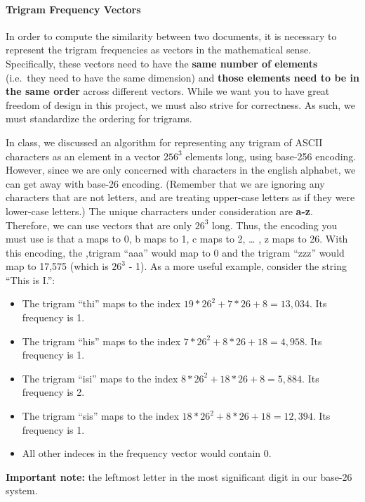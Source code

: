 \documentclass[]{article}
\providecommand{\tightlist}{%
  \setlength{\itemsep}{0pt}\setlength{\parskip}{0pt}}
\let\oldparagraph\paragraph
\renewcommand{\paragraph}[1]{\oldparagraph{#1}\mbox{}}
\begin{document}
\paragraph{Trigram Frequency Vectors}\label{trigram-frequency-vectors}

In order to compute the similarity between two documents, it is
necessary to represent the trigram frequencies as vectors in the
mathematical sense. Specifically, these vectors need to have the
\textbf{same number of elements} (i.e.~they need to have the same
dimension) and \textbf{those elements need to be in the same order}
across different vectors. While we want you to have great freedom of
design in this project, we must also strive for correctness. As such, we
must standardize the ordering for trigrams.

In class, we discussed an algorithm for representing any trigram of
ASCII characters as an element in a vector \(256^3\) elements long,
using base-256 encoding. However, since we are only concerned with
characters in the english alphabet, we can get away with base-26
encoding. (Remember that we are ignoring any characters that are not
letters, and are treating upper-case letters as if they were lower-case
letters.) The unique charracters under consideration are \textbf{a-z}.
Therefore, we can use vectors that are only \(26^3\) long. Thus, the
encoding you must use is that a maps to 0, b maps to 1, c maps to 2,
\ldots{} , z maps to 26. With this encoding, the ,trigram ``aaa'' would
map to 0 and the trigram ``zzz'' would map to 17,575 (which is \(26^3\)
- 1). As a more useful example, consider the string ``This is I.'':

\begin{itemize}
\tightlist
\item
  The trigram ``thi'' maps to the index \(19*26^2 + 7*26 + 8 = 13,034\).
  Its frequency is 1.
\item
  The trigram ``his'' maps to the index \(7*26^2 + 8*26 + 18 = 4,958\).
  Its frequency is 1.
\item
  The trigram ``isi'' maps to the index \(8*26^2 + 18*26 + 8 = 5,884\).
  Its frequency is 2.
\item
  The trigram ``sis'' maps to the index
  \(18*26^2 + 8*26 + 18 = 12,394\). Its frequency is 1.
\item
  All other indeces in the frequency vector would contain 0.
\end{itemize}

\textbf{Important note:} the leftmost letter in the most significant
digit in our base-26 system.
\end{document}
